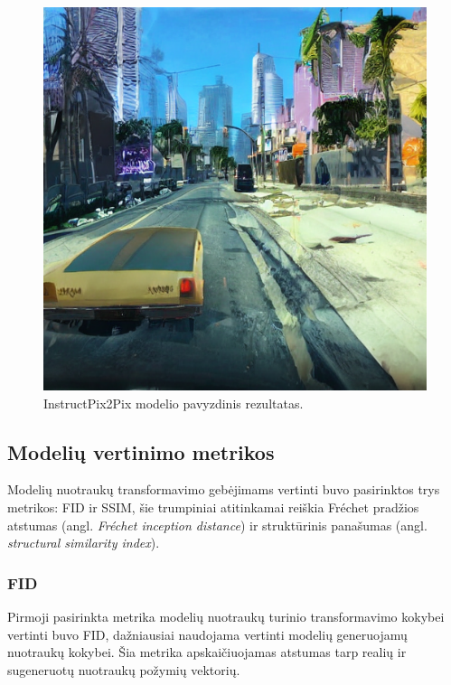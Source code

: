 \documentclass{VUMIFPSbakalaurinis}
\begin{document}
            \begin{figure}[H]
                \centering
                \includegraphics[scale=0.7]{img/diffusion/cycle/512}
                \caption{InstructPix2Pix modelio pavyzdinis rezultatas.}
                \label{img:mlp}
            \end{figure}
            
    \subsection{Modelių vertinimo metrikos}
        Modelių nuotraukų transformavimo gebėjimams vertinti buvo pasirinktos trys metrikos: FID ir SSIM, šie trumpiniai atitinkamai reiškia Fréchet pradžios atstumas (angl. \emph{Fréchet inception distance}) ir struktūrinis panašumas (angl. \emph{structural similarity index}).
        
        \subsubsection{FID}
            Pirmoji pasirinkta metrika modelių nuotraukų turinio transformavimo kokybei vertinti buvo FID, dažniausiai naudojama vertinti modelių generuojamų nuotraukų kokybei. Šia metrika apskaičiuojamas atstumas tarp realių ir sugeneruotų nuotraukų požymių vektorių.
    
\end{document}
